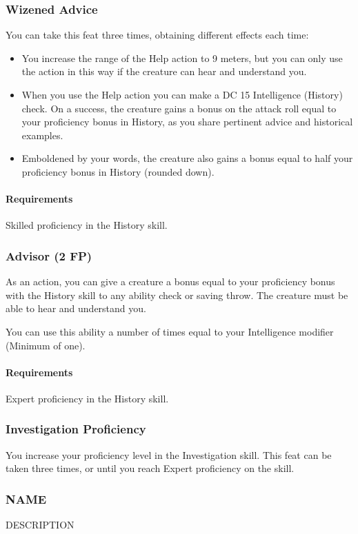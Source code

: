\subsubsection{Wizened Advice} \label{feat::wizenedadvice}
    You can take this feat three times, obtaining different effects each time:
    \begin{itemize}
        \item You increase the range of the Help action to 9 meters, but you can only use the action in this way if the creature can hear and understand you.
        \item When you use the Help action you can make a DC 15 Intelligence (History) check.
        On a success, the creature gains a bonus on the attack roll equal to your proficiency bonus in History, as you share pertinent advice and historical examples.
        \item Emboldened by your words, the creature also gains a bonus equal to half your proficiency bonus in History (rounded down).
    \end{itemize}
    \paragraph{Requirements} Skilled proficiency in the History skill.
\subsubsection{Advisor (2 FP)} \label{feat::advisor}
    As an action, you can give a creature a bonus equal to your proficiency bonus with the History skill to any ability check or saving throw.
    The creature must be able to hear and understand you.

    You can use this ability a number of times equal to your Intelligence modifier (Minimum of one).
    \paragraph{Requirements} Expert proficiency in the History skill.
\subsubsection{Investigation Proficiency} \label{feat::investigationprof}
    You increase your proficiency level in the Investigation skill.
    This feat can be taken three times, or until you reach Expert proficiency on the skill.
\subsubsection{NAME} \label{feat::name}
    DESCRIPTION

